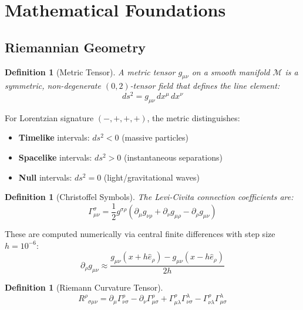 \documentclass[12pt, a4paper]{article}
\newtheorem{definition}[theorem]{Definition}
\begin{document}
\section{Mathematical Foundations}
\label{sec:math}

\subsection{Riemannian Geometry}

\begin{definition}[Metric Tensor]
A metric tensor $g_{\mu\nu}$ on a smooth manifold $\mathcal{M}$ is a symmetric,
non-degenerate $(0,2)$-tensor field that defines the line element:
\begin{equation}
    ds^2 = g_{\mu\nu} \, dx^\mu \, dx^\nu
\end{equation}
\end{definition}

For Lorentzian signature $(-,+,+,+)$, the metric distinguishes:
\begin{itemize}
    \item \textbf{Timelike} intervals: $ds^2 < 0$ (massive particles)
    \item \textbf{Spacelike} intervals: $ds^2 > 0$ (instantaneous separations)
    \item \textbf{Null} intervals: $ds^2 = 0$ (light/gravitational waves)
\end{itemize}

\begin{definition}[Christoffel Symbols]
The Levi-Civita connection coefficients are:
\begin{equation}
    \Gamma^\sigma_{\mu\nu} = \frac{1}{2} g^{\sigma\rho}
    \left( \partial_\mu g_{\nu\rho} + \partial_\nu g_{\mu\rho}
           - \partial_\rho g_{\mu\nu} \right)
\end{equation}
\end{definition}

These are computed numerically via central finite differences with step size
$h = 10^{-6}$:
\begin{equation}
    \partial_\rho g_{\mu\nu} \approx
    \frac{g_{\mu\nu}(x + h\hat{e}_\rho) - g_{\mu\nu}(x - h\hat{e}_\rho)}{2h}
\end{equation}

\begin{definition}[Riemann Curvature Tensor]
\begin{equation}
    R^\rho{}_{\sigma\mu\nu} =
    \partial_\mu \Gamma^\rho_{\nu\sigma}
    - \partial_\nu \Gamma^\rho_{\mu\sigma}
    + \Gamma^\rho_{\mu\lambda} \Gamma^\lambda_{\nu\sigma}
    - \Gamma^\rho_{\nu\lambda} \Gamma^\lambda_{\mu\sigma}
\end{equation}
\end{definition}
\end{document}
